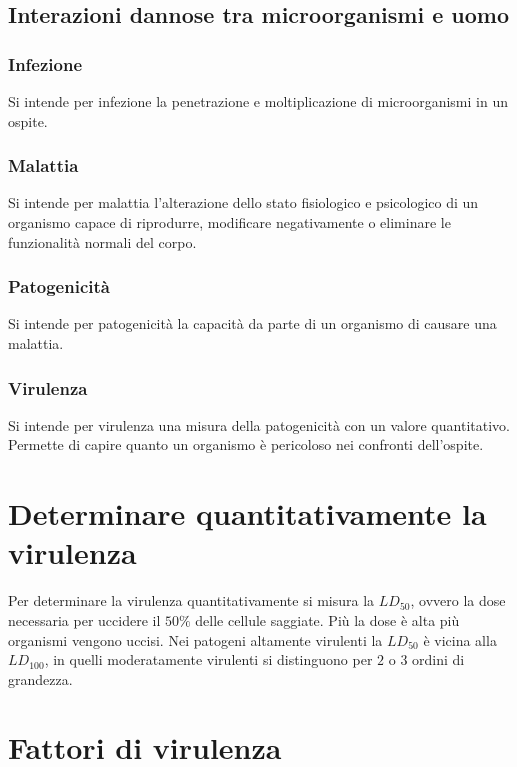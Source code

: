 	\subsection{Interazioni dannose tra microorganismi e uomo}
		
		\subsubsection{Infezione}
		Si intende per infezione la penetrazione e moltiplicazione di microorganismi in un ospite.

		\subsubsection{Malattia}
		Si intende per malattia l'alterazione dello stato fisiologico e psicologico di un organismo capace di riprodurre, modificare negativamente o eliminare le funzionalit\`a normali del corpo.

		\subsubsection{Patogenicit\`a}
		Si intende per patogenicit\`a la capacit\`a da parte di un organismo di causare una malattia.

		\subsubsection{Virulenza}
		Si intende per virulenza una misura della patogenicit\`a con un valore quantitativo.
		Permette di capire quanto un organismo \`e pericoloso nei confronti dell'ospite.

\section{Determinare quantitativamente la virulenza}
Per determinare la virulenza quantitativamente si misura la $LD_{50}$, ovvero la dose necessaria per uccidere il $50\%$ delle cellule saggiate.
Pi\`u la dose \`e alta pi\`u organismi vengono uccisi.
Nei patogeni altamente virulenti la $LD_{50}$ \`e vicina alla $LD_{100}$, in quelli moderatamente virulenti si distinguono per $2$ o $3$ ordini di grandezza.

\section{Fattori di virulenza}

